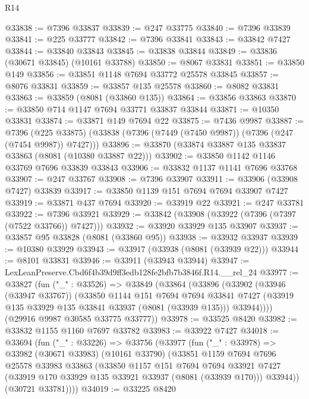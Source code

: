 \begin{lexlean}{R14}
\begin{coremodule}
@33838 := @7396 @33837
@33839 := @247 @33775
@33840 := @7396 @33839
@33841 := @225 @33777
@33842 := @7396 @33841
@33843 := @33842 @7427
@33844 := @33840 @33843
@33845 := @33838 @33844
@33849 := @33836 (@30671 @33845) (@10161 @33788)
@33850 := @8067 @33831
@33851 := @33850 @149
@33856 := @33851 @1148 @7694 @33772 @25578 @33845
@33857 := @8076 @33831
@33859 := @33857 @135 @25578
@33860 := @8082 @33831
@33863 := @33859 (@8081 (@33860 @135))
@33864 := @33856 @33863
@33870 := @33850 @714 @1147 @7694 @33771 @33837 @33844
@33871 := @10350 @33831
@33874 := @33871 @149 @7694 @22
@33875 := @7436 @9987
@33887 := @7396
    (@225 @33875)
    (@33838 (@7396 (@7449 (@7450 @9987)) (@7396 (@247 (@7454 @9987)) @7427)))
@33896 := @33870 (@33874 @33887 @135 @33837 @33863 (@8081 (@10380 @33887 @22)))
@33902 := @33850 @1142 @1146 @33769 @7696 @33839 @33843
@33906 := @33832 @1137 @1141 @7696 @33768
@33907 := @247 @33767
@33908 := @7396 @33907
@33911 := @33906 (@33908 @7427) @33839
@33917 := @33850 @1139 @151 @7694 @7694 @33907 @7427
@33919 := @33871 @437 @7694
@33920 := @33919 @22
@33921 := @247 @33781
@33922 := @7396 @33921
@33929 := @33842 (@33908 (@33922 (@7396 (@7397 (@7522 @33766)) @7427)))
@33932 := @33920 @33929 @135 @33907
@33937 := @33857 @95 @33828 (@8081 (@33860 @95))
@33938 := @33932 @33937
@33939 := @10380 @33929
@33943 := @33917 (@33938 (@8081 (@33939 @22)))
@33944 := @8101 @33831
@33946 := @33911 (@33943 @33944)
@33947 := LexLeanPreserve.Cbd6f4b39d9ff3edb128fe2bfb7b3846f.R14.__rel_24
@33977 := @33827
    (fun ("_" : @33526) =>
    @33849
      (@33864
        (@33896
          (@33902
            (@33946 (@33947 @33767))
            (@33850
              @1144
              @151
              @7694
              @7694
              @33841
              @7427
              (@33919 @135 @33929 @135 @33841 @33937 (@8081 (@33939 @135)))
              @33944))))
      (@29916 @9987 @30585 @33775 @33777))
@33978 := @33525 @8420
@33982 := @33832 @1155 @1160 @7697 @33782
@33983 := @33922 @7427
@34018 := @33694
    (fun ("_" : @33226) =>
    @33756
      (@33977
        (fun ("_" : @33978) =>
        @33982
          (@30671 @33983)
          (@10161 @33790)
          (@33851
            @1159
            @7694
            @7696
            @25578
            @33983
            @33863
            (@33850
              @1157
              @151
              @7694
              @7694
              @33921
              @7427
              (@33919 @170 @33929 @135 @33921 @33937 (@8081 (@33939 @170)))
              @33944))
          (@30721 @33781))))
@34019 := @33225 @8420

\end{coremodule}
\end{lexlean}
